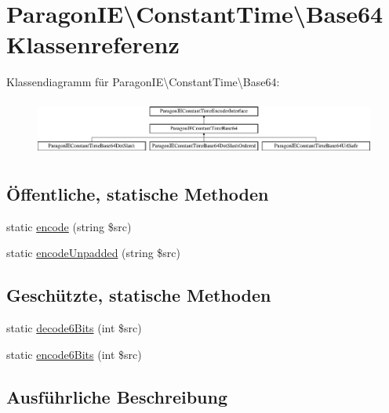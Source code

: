 \hypertarget{class_paragon_i_e_1_1_constant_time_1_1_base64}{}\section{Paragon\+IE\textbackslash{}Constant\+Time\textbackslash{}Base64 Klassenreferenz}
\label{class_paragon_i_e_1_1_constant_time_1_1_base64}
Klassendiagramm für Paragon\+IE\textbackslash{}Constant\+Time\textbackslash{}Base64\+:\begin{figure}[H]
\begin{center}
\leavevmode
\includegraphics[height=1.854305cm]{class_paragon_i_e_1_1_constant_time_1_1_base64}
\end{center}
\end{figure}
\subsection*{Öffentliche, statische Methoden}
\begin{DoxyCompactItemize}
\item 
static \mbox{\hyperlink{class_paragon_i_e_1_1_constant_time_1_1_base64_ac7133a444b198643a07447d558d43669}{encode}} (string \$src)
\item 
static \mbox{\hyperlink{class_paragon_i_e_1_1_constant_time_1_1_base64_aba18722b020762b47f6e86a7df6fbb83}{encode\+Unpadded}} (string \$src)
\end{DoxyCompactItemize}
\subsection*{Geschützte, statische Methoden}
\begin{DoxyCompactItemize}
\item 
static \mbox{\hyperlink{class_paragon_i_e_1_1_constant_time_1_1_base64_ad4f782db9d606b16599718a8ba876efc}{decode6\+Bits}} (int \$src)
\item 
static \mbox{\hyperlink{class_paragon_i_e_1_1_constant_time_1_1_base64_ae249195486f9ab9805bd56209bddb261}{encode6\+Bits}} (int \$src)
\end{DoxyCompactItemize}


\subsection{Ausführliche Beschreibung}


